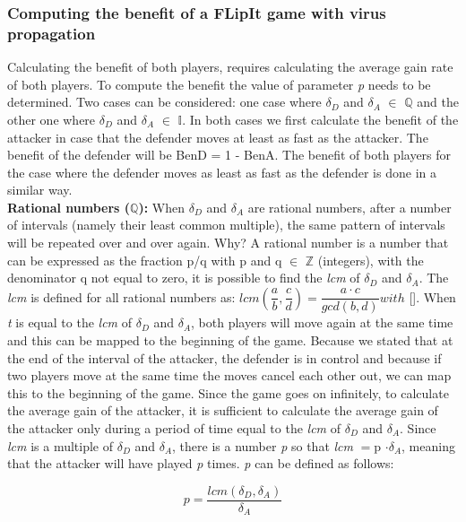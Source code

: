 \subsubsection{Computing the benefit of a FLipIt game with virus propagation}

Calculating the benefit of both players, requires calculating the average gain rate of both players. To compute the benefit the value of parameter \textit{p} needs to be determined. Two cases can be considered: one case where $\delta_{D}$ and $\delta_{A}$ $\in$ \(\mathbb{Q}\) and the other one where $\delta_{D}$ and $\delta_{A}$ $\in$ \(\mathbb{I}.\) In both cases we first calculate the benefit of the attacker in case that the defender moves at least as fast as the attacker. The benefit of the defender will be BenD = 1 - BenA. The benefit of both players for the case where the defender moves as least as fast as the defender is done in a similar way.  \\

\textbf{Rational numbers (\(\mathbb{Q}\)):} When $\delta_{D}$ and $\delta_{A}$ are rational numbers, after a number of intervals (namely their least common multiple), the same pattern of intervals will be repeated over and over again. Why? A rational number is a number that can be expressed as the fraction p/q with p and q $\in$ \(\mathbb{Z}\) (integers), with the denominator q not equal to zero, it is possible to find the \textit{lcm} of $\delta_{D}$ and $\delta_{A}$. The \textit{lcm} is defined for all rational numbers as: $lcm(\dfrac{a}{b},\dfrac{c}{d})= \dfrac{a \cdot c}{gcd(b,d)} with  $ []. When \textit{t} is equal to the \textit{lcm} of $\delta_{D}$ and $\delta_{A}$, both players will move again at the same time and this can be mapped to the beginning of the game. Because we stated that at the end of the interval of the attacker, the defender is in control and because if two players move at the same time the moves cancel each other out, we can map this to the beginning of the game. Since the game goes on infinitely, to calculate the average gain of the attacker, it is sufficient to calculate the average gain of the attacker only during a period of time equal to the \textit{lcm} of $\delta_{D}$ and $\delta_{A}$. Since \textit{lcm} is a multiple of $\delta_{D}$ and $\delta_{A}$, there is a number \textit{p} so that \textit{lcm} $=$p $\cdot \delta_{A}$, meaning that the attacker will have played \textit{p} times. \textit{p} can be defined as follows:


\begin{equation}\label{first}
p = \dfrac{lcm(\delta_{D},\delta_{A})}{\delta_{A} } 
\end{equation}



